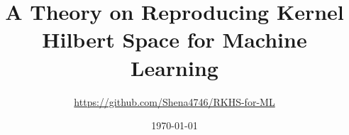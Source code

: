 \documentclass[a4paper,12pt]{article}
\begin{document}
\title{A Theory on Reproducing Kernel Hilbert Space for Machine Learning}
\author{\url{https://github.com/Shena4746/RKHS-for-ML}}
\date{\today}
\maketitle
\end{document}
